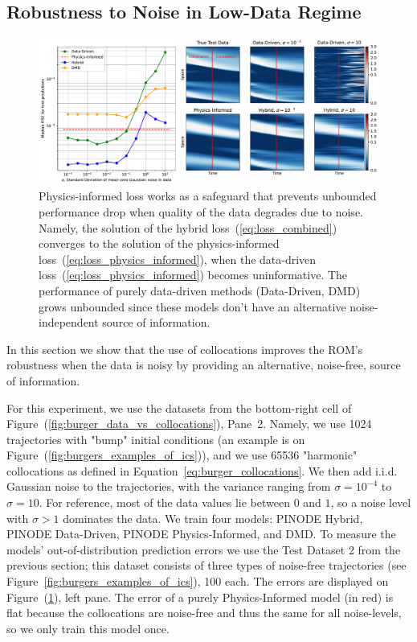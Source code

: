 \subsection{Robustness to Noise in Low-Data Regime}
\label{sec:burger_noise}
\begin{figure}[ht]
    \centering
    \includegraphics[width=\textwidth]{figures/burgers_noise.pdf}
    \caption{Physics-informed loss works as a safeguard that prevents unbounded performance drop when quality of the data degrades due to noise. Namely, the solution of the hybrid loss~(\ref{eq:loss_combined}) converges to the solution of the physics-informed loss~(\ref{eq:loss_physics_informed}), when the data-driven loss~(\ref{eq:loss_physics_informed}) becomes uninformative. The performance of purely data-driven methods (Data-Driven, DMD) grows unbounded since these models don't have an alternative noise-independent source of information.}
    \label{fig:burger_noise}
\end{figure}

In this section we show that the use of collocations improves the ROM's robustness when the data is noisy by providing an alternative, noise-free, source of information.

For this experiment, we use the datasets from the bottom-right cell of Figure~(\ref{fig:burger_data_vs_collocations}), Pane~2. Namely, we use 1024 trajectories with "bump" initial conditions (an example is on Figure~(\ref{fig:burgers_examples_of_ics})), and we use 65536 "harmonic" collocations as defined in Equation~\ref{eq:burger_collocations}. We then add i.i.d. Gaussian noise to the trajectories, with the variance ranging from $\sigma = 10^{-4}$ to $\sigma = 10$. For reference, most of the data values lie between $0$ and $1$, so a noise level with $\sigma > 1$ dominates the data. We train four models: PINODE Hybrid, PINODE Data-Driven, PINODE Physics-Informed, and DMD. To measure the models' out-of-distribution prediction errors we use the Test Dataset 2 from the previous section; this dataset consists of three types of noise-free trajectories (see Figure~\ref{fig:burgers_examples_of_ics}), 100 each. The errors are displayed on Figure~(\ref{fig:burger_noise}), left pane. The error of a purely Physics-Informed model (in red) is flat because the collocations are noise-free and thus the same for all noise-levels, so we only train this model once. 

